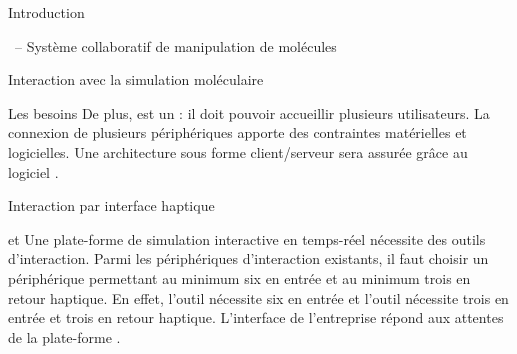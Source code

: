 \documentclass[myfrancais]{mythesis}
\begin{document}
\begin{mypart}{Introduction}
\begin{mychapter}{\myShaddock\ -- Système collaboratif de manipulation de molécules}
\begin{mysection}{Interaction avec la simulation moléculaire}
\begin{mysubsection}{Les besoins}
					De plus, \myShaddock est un  : il doit pouvoir accueillir plusieurs utilisateurs.
					La connexion de plusieurs périphériques apporte des contraintes matérielles et logicielles.
					Une architecture sous forme client/serveur sera assurée grâce au logiciel  .
				\end{mysubsection}
				\begin{mysubsection}{Interaction par interface haptique}
					\begin{mysubsubsection}{\myOmni et \myOpenHaptics}
						Une plate-forme de simulation interactive en temps-réel nécessite des outils d'interaction.
						Parmi les périphériques d'interaction existants, il faut choisir un périphérique permettant au minimum six  en entrée et au minimum trois  en retour haptique.
						En effet, l'outil  nécessite six  en entrée et l'outil  nécessite trois  en entrée et trois  en retour haptique.
						L'interface \myOmni {} de l'entreprise \mySensAble répond aux attentes de la plate-forme \myShaddock {}.

						\begin{myfigure}
						\end{myfigure}


\end{mysubsubsection}
\end{mysubsection}
\end{mysection}
\end{mychapter}
\end{mypart}
\end{document}
